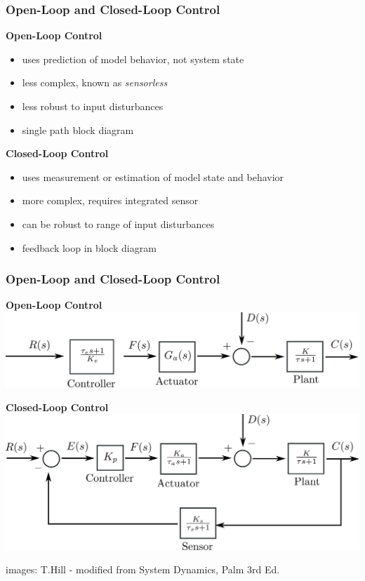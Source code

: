 \documentclass[fleqn]{beamer} %
\newcommand{\sectionIsubsectionItitle}{Open-Loop and Closed-Loop Control}
\begin{document}
			\begin{frame}
				\frametitle{\sectionIsubsectionItitle}
				\bigskip

				\textbf{Open-Loop Control}
				\begin{itemize}

					\item uses prediction of model behavior, not system state

					\item less complex, known as {\it sensorless} 

					\item less robust to input disturbances

					\item single path block diagram

				\end{itemize}

				\vspace*{5mm}
				\textbf{Closed-Loop Control}
				\begin{itemize}

					\item uses measurement or estimation of model state and behavior

					\item more complex, requires integrated sensor

					\item can be robust to range of input disturbances 

					\item feedback loop in block diagram

				\end{itemize}

 
				\btVFill
			\end{frame}

				\begin{frame}\small
				\frametitle{\sectionIsubsectionItitle}
				\bigskip

				\textbf{Open-Loop Control}
				\includegraphics[scale=0.03]{images/open_loop_control.png}
				
				\vspace*{5mm}
				\textbf{Closed-Loop Control}
				\includegraphics[scale=0.03]{images/closed_loop_control.png}
				
				\btVFill
				{\tiny images: T.Hill - modified from System Dynamics, Palm 3rd Ed.}
			\end{frame}
\end{document}
